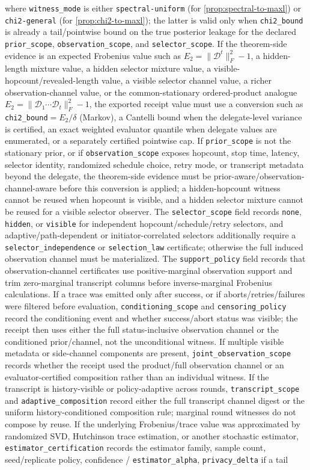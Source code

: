 \documentclass[11pt]{article}
\begin{document}
where \texttt{witness\_mode} is either \texttt{spectral-uniform} (for \cref{prop:spectral-to-maxl}) or \texttt{chi2-general} (for \cref{prop:chi2-to-maxl}); the latter is valid only when \texttt{chi2\_bound} is already a tail/pointwise bound on the true posterior leakage for the declared \texttt{prior\_scope}, \texttt{observation\_scope}, and \texttt{selector\_scope}. If the theorem-side evidence is an expected Frobenius value such as $E_2=\|\mathcal D^t\|_F^2-1$, a hidden-length mixture value, a hidden selector mixture value, a visible-hopcount/revealed-length value, a visible selector channel value, a richer observation-channel value, or the common-stationary ordered-product analogue $E_2=\|\mathcal D_1\cdots\mathcal D_t\|_F^2-1$, the exported receipt value must use a conversion such as \texttt{chi2\_bound}$=E_2/\delta$ (Markov), a Cantelli bound when the delegate-level variance is certified, an exact weighted evaluator quantile when delegate values are enumerated, or a separately certified pointwise cap. If \texttt{prior\_scope} is not the stationary prior, or if \texttt{observation\_scope} exposes hopcount, stop time, latency, selector identity, randomized schedule choice, retry mode, or transcript metadata beyond the delegate, the theorem-side evidence must be prior-aware/observation-channel-aware before this conversion is applied; a hidden-hopcount witness cannot be reused when hopcount is visible, and a hidden selector mixture cannot be reused for a visible selector observer. The \texttt{selector\_scope} field records \texttt{none}, \texttt{hidden}, or \texttt{visible} for independent hopcount/schedule/retry selectors, and adaptive/path-dependent or initiator-correlated selectors additionally require a \texttt{selector\_independence} or \texttt{selection\_law} certificate; otherwise the full induced observation channel must be materialized. The \texttt{support\_policy} field records that observation-channel certificates use positive-marginal observation support and trim zero-marginal transcript columns before inverse-marginal Frobenius calculations. If a trace was emitted only after success, or if aborts/retries/failures were filtered before evaluation, \nolinkurl{conditioning_scope} and \nolinkurl{censoring_policy} record the conditioning event and whether success/abort status was visible; the receipt then uses either the full status-inclusive observation channel or the conditioned prior/channel, not the unconditional witness. If multiple visible metadata or side-channel components are present, \nolinkurl{joint_observation_scope} records whether the receipt used the product/full observation channel or an evaluator-certified composition rather than an individual witness. If the transcript is history-visible or policy-adaptive across rounds, \nolinkurl{transcript_scope} and \nolinkurl{adaptive_composition} record either the full transcript channel digest or the uniform history-conditioned composition rule; marginal round witnesses do not compose by reuse. If the underlying Frobenius/trace value was approximated by randomized SVD, Hutchinson trace estimation, or another stochastic estimator, \nolinkurl{estimator_certification} records the estimator family, sample count, seed/replicate policy, confidence / \nolinkurl{estimator_alpha}, \nolinkurl{privacy_delta} if a tail 
\end{document}
